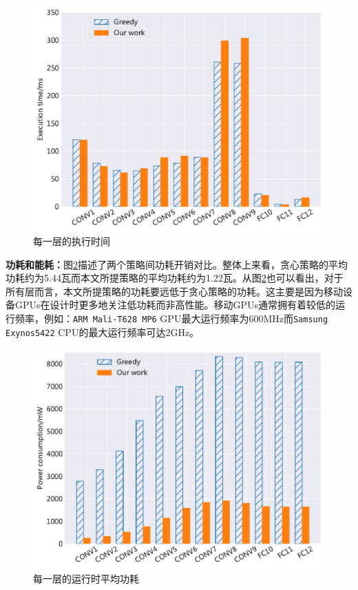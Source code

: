 \begin{figure}[htbp]
    \centering
    \includegraphics[height=0.4\textwidth]{figures/hc_time.pdf}
    \caption{每一层的执行时间}\label{figure:figure32}
\end{figure}

\textbf{功耗和能耗：}图\ref{figure:figure33}描述了两个策略间功耗开销对比。整体上来看，贪心策略的平均功耗约为5.44瓦而本文所提策略的平均功耗约为1.22瓦。从图\ref{figure:figure33}也可以看出，对于所有层而言，本文所提策略的功耗要远低于贪心策略的功耗。这主要是因为移动设备GPUs在设计时更多地关注低功耗而非高性能。移动GPUs通常拥有着较低的运行频率，例如：\texttt{ARM Mali-T628 MP6} GPU最大运行频率为600MHz而\texttt{Samsung Exynos5422} CPU的最大运行频率可达2GHz\cite{hardkernel.com}。


\begin{figure}[htbp]
    \centering
    \includegraphics[height=0.4\textwidth]{figures/hc_power.pdf}
    \caption{每一层的运行时平均功耗}\label{figure:figure33}
\end{figure}

